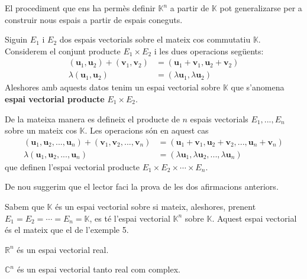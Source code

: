 El procediment que ens ha permès definir $\mathbb{K}^{n}$ a partir de $%
\mathbb{K}$ pot generalizarse per a construir nous espais a partir de
espais coneguts.

Siguin $E_{1}$ i $E_{2}$ dos espais vectorials sobre el
mateix cos commutatiu $\mathbb{K}$. Considerem el conjunt producte $%
E_{1}\times E_{2}$ i les dues operacions següents:%
\begin{align*}
(\mathbf{u}_{1},\mathbf{u}_{2})+(\mathbf{v}_{1},\mathbf{v}_{2}) &=(\mathbf{u%
}_{1}+\mathbf{v}_{1},\mathbf{u}_{2}+\mathbf{v}_{2}) \\
\lambda (\mathbf{u}_{1},\mathbf{u}_{2}) &=(\lambda \mathbf{u}_{1},\lambda 
\mathbf{u}_{2})
\end{align*}%
Aleshores amb aquests datos tenim un espai vectorial sobre $\mathbb{K}$ que
s’anomena \textbf{espai vectorial producte} $E_{1}\times E%
_{2}$.

De la mateixa manera es defineix el producte de $n$ espais vectorials $E%
_{1},...,E_{n}$ sobre un mateix cos $\mathbb{K}$. Les operacions
són en aquest cas%
\begin{align*}
(\mathbf{u}_{1},\mathbf{u}_{2},...,\mathbf{u}_{n})+(\mathbf{v}_{1},\mathbf{v}%
_{2},...,\mathbf{v}_{n}) &=(\mathbf{u}_{1}+\mathbf{v}_{1},\mathbf{u}_{2}+%
\mathbf{v}_{2},...,\mathbf{u}_{n}+\mathbf{v}_{n}) \\
\lambda (\mathbf{u}_{1},\mathbf{u}_{2},...,\mathbf{u}_{n}) &=(\lambda 
\mathbf{u}_{1},\lambda \mathbf{u}_{2},...,\lambda \mathbf{u}_{n})
\end{align*}%
que definen l’espai vectorial producte $E_{1}\times E%
_{2}\times \cdots \times E_{n}$.

\begin{observacio}
De nou suggerim que el lector faci la prova de les dos
afirmacions anteriors.
\end{observacio}

Sabem que $\mathbb{K}$ és un espai vectorial sobre si mateix,
aleshores, prenent $E_{1}=E_{2}=\cdots =E_{n}=%
\mathbb{K}$, es té l’espai vectorial $\mathbb{K}^{n}$ sobre $\mathbb{K}
$. Aquest espai vectorial és el mateix que el de l'exemple 5.

\begin{exemple}
$\mathbb{R}^{n}$ és un espai vectorial real.
\end{exemple}

\begin{exemple}
$\mathbb{C}^{n}$ és un espai vectorial tanto real com complex.
\end{exemple}

